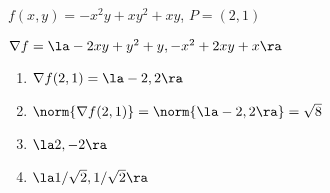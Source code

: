 {$f(x,y) = -x^2y+xy^2+xy$, $P= (2,1)$
}
{$\nabla f = \la -2xy+y^2+y, -x^2+2xy+x\ra$
\begin{enumerate}
	\item $\nabla f(2,1) = \la -2,2\ra$
	\item	$\norm{\nabla f(2,1)} = \norm{\la -2,2\ra} = \sqrt{8}$
	\item	$\la 2,-2\ra$
	\item	$\la 1/\sqrt{2},1/\sqrt{2}\ra$
\end{enumerate}
}